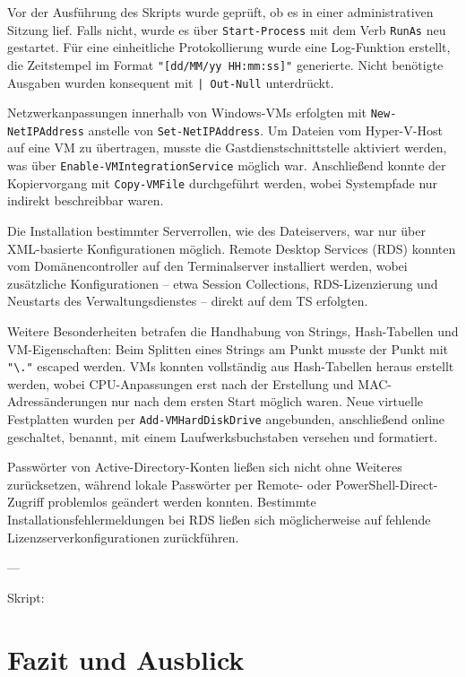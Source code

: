 \documentclass[conference]{IEEEtran}
\begin{document}
Vor der Ausführung des Skripts wurde geprüft, ob es in einer administrativen Sitzung lief. Falls nicht, wurde es über \texttt{Start-Process} mit dem Verb \texttt{RunAs} neu gestartet. Für eine einheitliche Protokollierung wurde eine Log-Funktion erstellt, die Zeitstempel im Format \texttt{"[dd/MM/yy HH:mm:ss]"} generierte. Nicht benötigte Ausgaben wurden konsequent mit \texttt{| Out-Null} unterdrückt.  

Netzwerkanpassungen innerhalb von Windows-VMs erfolgten mit \texttt{New-NetIPAddress} anstelle von \texttt{Set-NetIPAddress}. Um Dateien vom Hyper-V-Host auf eine VM zu übertragen, musste die Gastdienstschnittstelle aktiviert werden, was über \texttt{Enable-VMIntegrationService} möglich war. Anschließend konnte der Kopiervorgang mit \texttt{Copy-VMFile} durchgeführt werden, wobei Systempfade nur indirekt beschreibbar waren.  

Die Installation bestimmter Serverrollen, wie des Dateiservers, war nur über XML-basierte Konfigurationen möglich. Remote Desktop Services (RDS) konnten vom Domänencontroller auf den Terminalserver installiert werden, wobei zusätzliche Konfigurationen -- etwa Session Collections, RDS-Lizenzierung und Neustarts des Verwaltungsdienstes -- direkt auf dem TS erfolgten.  

Weitere Besonderheiten betrafen die Handhabung von Strings, Hash-Tabellen und VM-Eigenschaften: Beim Splitten eines Strings am Punkt musste der Punkt mit \texttt{"\textbackslash."} escaped werden. VMs konnten vollständig aus Hash-Tabellen heraus erstellt werden, wobei CPU-Anpassungen erst nach der Erstellung und MAC-Adressänderungen nur nach dem ersten Start möglich waren. Neue virtuelle Festplatten wurden per \texttt{Add-VMHardDiskDrive} angebunden, anschließend online geschaltet, benannt, mit einem Laufwerksbuchstaben versehen und formatiert.  

Passwörter von Active-Directory-Konten ließen sich nicht ohne Weiteres zurücksetzen, während lokale Passwörter per Remote- oder PowerShell-Direct-Zugriff problemlos geändert werden konnten. Bestimmte Installationsfehlermeldungen bei RDS ließen sich möglicherweise auf fehlende Lizenzserverkonfigurationen zurückführen.

---

Skript:


\chapter{Fazit und Ausblick}
\end{document}
